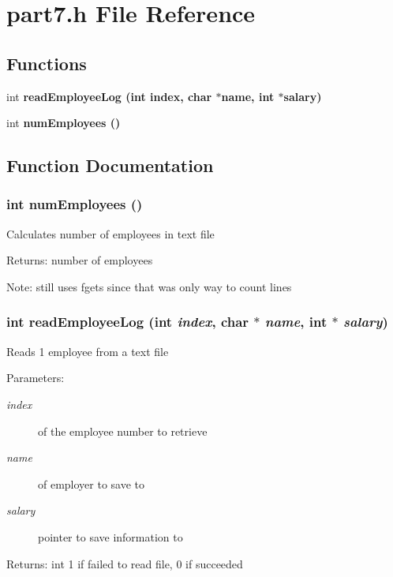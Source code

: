 \section{part7.h File Reference}
\label{part7_8h}
\subsection*{Functions}
\begin{CompactItemize}
\item 
int \bf{read\-Employee\-Log} (int index, char $\ast$name, int $\ast$salary)
\item 
int \bf{num\-Employees} ()
\end{CompactItemize}


\subsection{Function Documentation}
\subsubsection{\setlength{\rightskip}{0pt plus 5cm}int num\-Employees ()}\label{part7_8h_801748b5d2d028f0482ce56bb43d331c}


Calculates number of employees in text file \begin{Desc}
\item[Returns:]number of employees \end{Desc}
\begin{Desc}
\item[Note:]still uses fgets since that was only way to count lines \end{Desc}
\subsubsection{\setlength{\rightskip}{0pt plus 5cm}int read\-Employee\-Log (int {\em index}, char $\ast$ {\em name}, int $\ast$ {\em salary})}\label{part7_8h_6eba06bb925710329353f8f4bcfa3192}


Reads 1 employee from a text file \begin{Desc}
\item[Parameters:]
\begin{description}
\item[{\em index}]of the employee number to retrieve \item[{\em name}]of employer to save to \item[{\em salary}]pointer to save information to \end{description}
\end{Desc}
\begin{Desc}
\item[Returns:]int 1 if failed to read file, 0 if succeeded \end{Desc}
